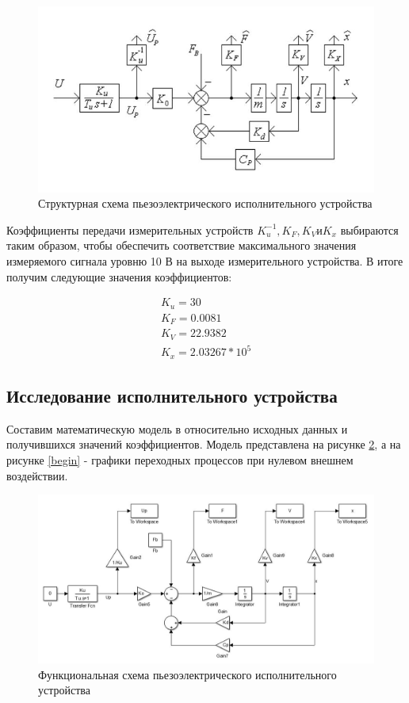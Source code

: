 \documentclass[a4paper, 12pt]{article}
\begin{document}
\begin{figure}[h!]
	\centering
	\includegraphics[width = 0.65\textheight]{first}
	\caption{Структурная схема пьезоэлектрического исполнительного устройства}
	\label{first}
\end{figure}

Коэффициенты передачи измерительных устройств $K_u^{-1}, K_F, K_V \text{и} K_x$ выбираются таким образом, чтобы обеспечить соответствие максимального значения измеряемого сигнала уровню 10 В на выходе измерительного устройства. В итоге получим следующие значения коэффициентов:

\begin{gather}
	K_u = 30\\
	K_F = 0.0081\\
	K_V = 22.9382\\
	K_x = 2.03267*10^5	
\end{gather}

\newpage


\begin{center}
	\section{Исследование исполнительного устройства}
\end{center}

Составим математическую модель в относительно исходных данных и получившихся значений коэффициентов. Модель представлена на рисунке \ref{funkshem}, а на рисунке \ref{begin} - графики переходных процессов при нулевом внешнем воздействии. 

\begin{figure}[h!]
	\centering
	\includegraphics[width = 0.6\textheight]{funkshem}
	\caption{Функциональная схема пьезоэлектрического исполнительного устройства}
	\label{funkshem}
\end{figure}
\end{document}
